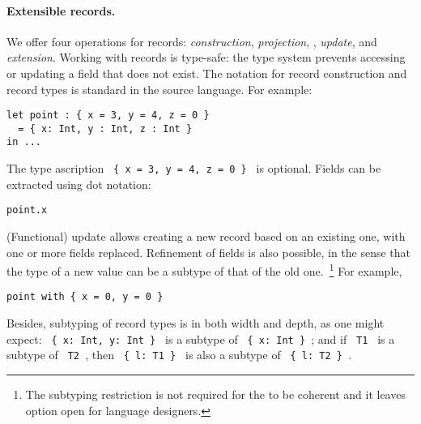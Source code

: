 {%

\paragraph{Extensible records.}




We offer four operations for records: \emph{construction}, \emph{projection}, ,
\emph{update}, and \emph{extension}. Working with records is type-safe: the type
system prevents accessing or updating a field that does not exist. The notation
for record construction and record types is standard in the source language. For
example:
\begin{lstlisting}
let point : { x = 3, y = 4, z = 0 } 
  = { x: Int, y : Int, z : Int } 
in ...
\end{lstlisting}
The type ascription \lstinline$ { x = 3, y = 4, z = 0 } $ is optional. Fields
can be extracted using dot notation:
\begin{lstlisting}
point.x
\end{lstlisting}
(Functional) update allows creating a new record based on an existing one, with
one or more fields replaced. Refinement of fields is also possible, in the sense
that the type of a new value can be a subtype of that of the old
one.~\footnote{The subtyping restriction is not required for the \name to be
  coherent and it leaves option open for language designers.} For example,
\begin{lstlisting}
point with { x = 0, y = 0 }
\end{lstlisting}
Besides, subtyping of record types is in both width and depth, as one might
expect: \lstinline$ { x: Int, y: Int } $ is a subtype of
\lstinline$ { x: Int } $; and if \lstinline$ T1 $ is a subtype of
\lstinline$ T2 $, then \lstinline$ { l: T1 } $ is also a subtype of
\lstinline$ { l: T2 } $.

}
